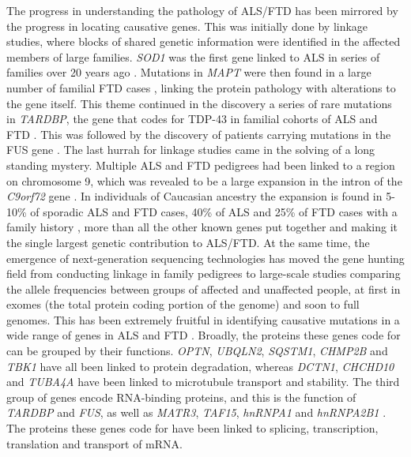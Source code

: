 The progress in understanding the pathology of ALS/FTD has been mirrored by the progress in locating causative genes. This was initially done by linkage studies, where blocks of shared genetic information were identified in the affected members of large families. \textit{SOD1} was the first gene linked to ALS in series of families over 20 years ago \citep{Rosen1993}. Mutations in \textit{MAPT} were then found in a large number of familial FTD cases \citep{Hutton1998}, linking the protein pathology with alterations to the gene itself. This theme continued in the discovery a series of rare mutations in \textit{TARDBP}, the gene that codes for TDP-43 in familial cohorts of ALS and FTD \citep{Sreedharan2008-xv}. This was followed by the discovery of patients carrying mutations in the FUS gene \citep{Vance2009-ye}. The last hurrah for linkage studies came in the solving of a long standing mystery. Multiple ALS and FTD pedigrees had been linked to a region on chromosome 9, which was revealed to be a large expansion in the intron of the \textit{C9orf72} gene \citep{Renton2011,DeJesus-Hernandez2011}. In individuals of Caucasian ancestry the expansion is found in 5-10\% of sporadic ALS and FTD cases, 40\% of ALS and 25\% of FTD cases with a family history \citep{Majounie2012}, more than all the other known genes put together and making it the single largest genetic contribution to ALS/FTD. At the same time, the emergence of next-generation sequencing technologies has moved the gene hunting field from conducting linkage in family pedigrees to large-scale studies comparing the allele frequencies between groups of affected and unaffected people, at first in exomes (the total protein coding portion of the genome) and soon to full genomes. This has been extremely fruitful in identifying causative mutations in a wide range of genes in ALS and FTD  \citep{Taylor2016,Pottier2016}. 
Broadly, the proteins these genes code for can be grouped by their functions. \textit{OPTN}, \textit{UBQLN2}, \textit{SQSTM1}, \textit{CHMP2B} and \textit{TBK1} have all been linked to protein degradation, whereas \textit{DCTN1}, \textit{CHCHD10} and \textit{TUBA4A} have been linked to microtubule transport and stability. The third group of genes encode RNA-binding proteins, and this is the function of \textit{TARDBP} and \textit{FUS}, as well as \textit{MATR3}, \textit{TAF15}, \textit{hnRNPA1} and \textit{hnRNPA2B1} . The proteins these genes code for have been linked to splicing, transcription, translation and transport of mRNA. 

